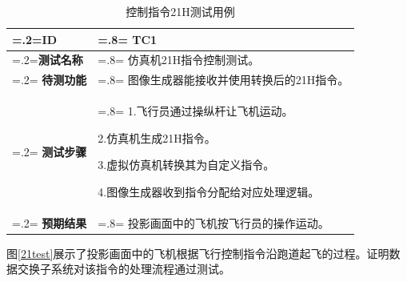 \begin{table}[h!]
    \begin{center}
        \caption{控制指令21H测试用例}
        \label{testcase}
        \renewcommand\arraystretch{1.5}
        \begin{tabularx}{0.8\textwidth}{ 
             >{\centering\arraybackslash\hsize=.2\hsize\linewidth=\hsize}X 
             >{\raggedright\arraybackslash\hsize=.8\hsize\linewidth=\hsize}X 
             }
             \hline
            \textbf{ID } & \textbf{TC1}\\
             \hline
             \textbf{测试名称} & 仿真机21H指令控制测试。\\
             \hline
             \textbf{待测功能} & 图像生成器能接收并使用转换后的21H指令。\\
             \hline
             \textbf{测试步骤} & 1.飞行员通过操纵杆让飞机运动。\par 2.仿真机生成21H指令。\par 3.虚拟仿真机转换其为自定义指令。\par 4.图像生成器收到指令分配给对应处理逻辑。  \\
             \hline
             \textbf{预期结果} & 投影画面中的飞机按飞行员的操作运动。\\
             \hline
            \end{tabularx}
    \end{center}
\end{table}
\par
图\ref{21test}展示了投影画面中的飞机根据飞行控制指令沿跑道起飞的过程。证明数据交换子系统对该指令的处理流程通过测试。

